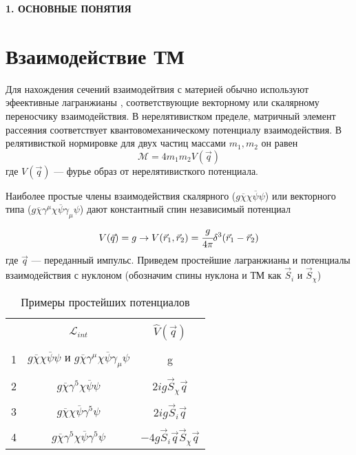\newpage
\begin{center}
	\textbf{\large 1. ОСНОВНЫЕ ПОНЯТИЯ}
\end{center}




\section{Взаимодействие ТМ}
Для нахождения сечений взаимодейтвия с материей обычно используют эфеективные лагранжианы \cite{Fitzpatrick_2013} , соответствующие векторному или скалярному переносчику взаимодействия. В нерелятивистком пределе, матричный элемент рассеяния соответствует квантовомеханическому потенциалу взаимодействия. В релятивисткой нормировке для двух частиц массами $m_1,m_2$ он равен 
\begin{equation}
	\label{eq:mat_element}
	\mathcal{M} = 4m_1 m_2 V(\vec{q})
\end{equation}
где $V(\vec{q})$ --- фурье образ от нерелятивисткого потенциала. 

Наиболее простые члены взаимодействия  скалярного ($g\overline{\chi}\chi\overline{\psi}\psi$) или векторного типа ($g\overline{\chi}\gamma^{\mu}\chi\overline{\psi}\gamma_{\mu}\psi$) дают константный спин независимый потенциал
\begin{eqnarray}
	V(\vec{q}) = g \rightarrow	V(\vec{r}_1,\vec{r}_2) = \cfrac{g}{4\pi}
	\delta^3(\vec{r}_1-\vec{r}_2)
\end{eqnarray}
где $\vec{q}$ --- переданный импульс. Приведем простейшие лагранжианы и потенциалы взаимодействия с нуклоном (обозначим спины нуклона и ТМ как $\vec{S}_{i}$ и  $\vec{S}_{\chi}$)

\begin{table}[ht]
	\begin{center}
		\begin{tabular}{|c|c|c|}
			\hline && \\[-1em] 
			 & $\mathcal{L}_{int}$ & $\hat{V}(\vec{q})$ \\
			\hline && \\[-1em] 
			1 & $g\overline{\chi}\chi\overline{\psi}\psi$ и 	
			$g\overline{\chi}\gamma^{\mu}\chi\overline{\psi}\gamma_{\mu}\psi$ & g \\
			\hline && \\[-1em] 
			2 & $g \overline{\chi}\gamma^5\chi\overline{\psi}\psi$ & $2ig \vec{S}_{\chi}\vec{q}$\\
			\hline && \\[-1em]
			3 & $g \overline{\chi}\chi\overline{\psi}\gamma^5\psi$ & $2ig \vec{S}_{i}\vec{q}$\\
			\hline && \\[-1em]
			4 & $g \overline{\chi}\gamma^5\chi\overline{\psi}\gamma^5\psi$ & $-4g \vec{S}_{i}\vec{q}\vec{S}_{\chi}\vec{q}$\\
			\hline
		\end{tabular}
		\caption{Примеры простейших потенциалов}
	\end{center}		
	\label{tb:potentials}
\end{table}

